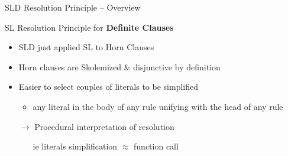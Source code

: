 \documentclass[presentation]{beamer}\mode<presentation>{\usetheme{AMSBolognaFC}}
\begin{document}
\begin{frame}{SLD Resolution Principle -- Overview}
    \begin{alertblock}{SL Resolution Principle for \textbf{Definite Clauses}}
        \begin{itemize}
            \item SLD just applied SL to Horn Clauses

            \item Horn clauses are Skolemized \& disjunctive \alert{by definition}

            \item Easier to select couples of literals to be simplified
            \begin{itemize}
                \item any literal in the \alert{body} of any rule \alert{unifying} with the \alert{head} of any rule
            \end{itemize}

            \item[$\rightarrow$] Procedural interpretation of resolution
            \begin{itemize}
                \item[ie] literals simplification $\approx$ function call
            \end{itemize}
        \end{itemize}
    \end{alertblock}
\end{frame}
\end{document}
